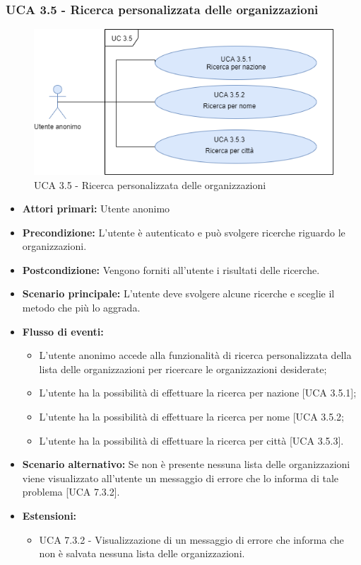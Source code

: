 \newpage

\subsubsection{UCA 3.5 - Ricerca personalizzata delle organizzazioni}%
\begin{figure}[h]
	\centering
	
	\includegraphics[scale=0.5]{sezioni/UseCase/Immagini/UCA3.5.png}
	\caption{UCA 3.5 - Ricerca personalizzata delle organizzazioni}
\end{figure}
\begin{itemize}
	\item \textbf{Attori primari:} Utente anonimo
	\item \textbf{Precondizione:} L'utente è autenticato e può svolgere ricerche riguardo le organizzazioni.
	\item \textbf{Postcondizione:} Vengono forniti all'utente i risultati delle ricerche.
	\item \textbf{Scenario principale:} L'utente deve svolgere alcune ricerche e sceglie il metodo che più lo aggrada.
	\item \textbf{Flusso di eventi:} 
	\begin{itemize}
		\item L'utente anonimo accede alla funzionalità di ricerca personalizzata della lista delle organizzazioni per ricercare le organizzazioni desiderate;
		\item L'utente ha la possibilità di effettuare la ricerca per nazione [UCA 3.5.1];
		\item L'utente ha la possibilità di effettuare la ricerca per nome [UCA 3.5.2;
		\item L'utente ha la possibilità di effettuare la ricerca per città [UCA 3.5.3].
	\end{itemize}
	\item \textbf{Scenario alternativo:} Se non è presente nessuna lista delle organizzazioni viene visualizzato all'utente un messaggio di errore che lo informa di tale problema [UCA 7.3.2].
	\item \textbf{Estensioni:}
	\begin{itemize}
		\item UCA 7.3.2 - Visualizzazione di un messaggio di errore che informa che non è salvata nessuna lista delle organizzazioni.
	\end{itemize}
\end{itemize}

